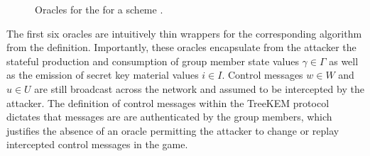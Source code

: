\begin{figure}[h!]
\centering
\caption{%
\label{fig:CGKA-Oracles}%
Oracles for the \CGKAsec for a scheme \CGKAdef.
}%
{}
\end{figure}

The first six oracles are intuitively thin wrappers for the corresponding algorithm from the \CGKAdef definition.
Importantly, these oracles encapsulate from the attacker the stateful production and consumption of group member state values \(\gamma \in \Gamma\) as well as the emission of secret key material values \(i \in I\).
Control messages \(w \in W\) and \(u \in U\) are still broadcast across the network and assumed to be intercepted by the attacker.
The definition of control messages within the TreeKEM protocol dictates that messages are are authenticated by the group members, which justifies the absence of an oracle permitting the attacker to change or replay intercepted control messages in the  game.

